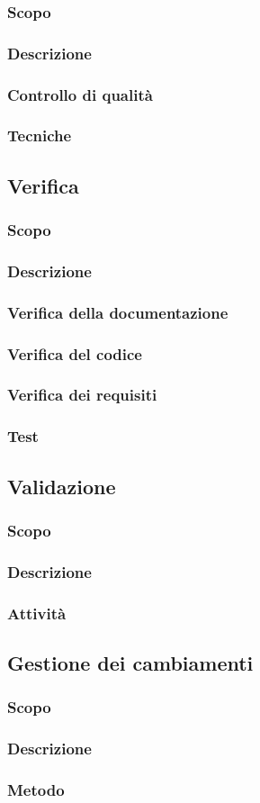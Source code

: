 \subsubsection{Scopo}
\subsubsection{Descrizione}
\subsubsection{Controllo di qualità}
\subsubsection{Tecniche}


\subsection{Verifica}
\subsubsection{Scopo}
\subsubsection{Descrizione}
\subsubsection{Verifica della documentazione}
\subsubsection{Verifica del codice}
\subsubsection{Verifica dei requisiti}
\subsubsection{Test}

\subsection{Validazione}
\subsubsection{Scopo}
\subsubsection{Descrizione}
\subsubsection{Attività}

\subsection{Gestione dei cambiamenti}
\subsubsection{Scopo}
\subsubsection{Descrizione}
\subsubsection{Metodo}